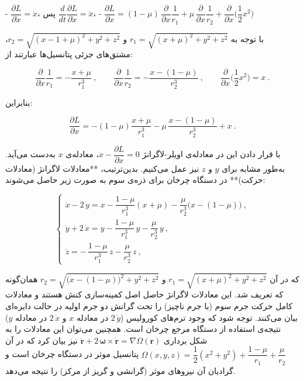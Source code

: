 - $\displaystyle \dfrac{\partial L}{\partial \dot{x}} = \dot{x}$، پس $\dfrac{d}{dt}\dfrac{\partial L}{\partial \dot{x}} = \ddot{x}$،  
- $\displaystyle \dfrac{\partial L}{\partial x} = (1-\mu)\,\dfrac{\partial}{\partial x}\dfrac{1}{r_1} + \mu\,\dfrac{\partial}{\partial x}\dfrac{1}{r_2} + \dfrac{\partial}{\partial x}\Big(\dfrac{1}{2}x^2\Big)$ 

با توجه به $r_1=\sqrt{(x+\mu)^2+y^2+z^2}$ و $r_2=\sqrt{(x-1+\mu)^2+y^2+z^2}$، مشتق‌های جزئی پتانسیل‌ها عبارتند از:

$$ 
\dfrac{\partial}{\partial x}\dfrac{1}{r_1} = -\dfrac{x+\mu}{r_1^3}~, \qquad 
\dfrac{\partial}{\partial x}\dfrac{1}{r_2} = -\dfrac{x-(1-\mu)}{r_2^3}~, \qquad 
\dfrac{\partial}{\partial x}\Big(\dfrac{1}{2}x^2\Big) = x~. 
$$

بنابراین:

$$ 
\dfrac{\partial L}{\partial x} = -(1-\mu)\dfrac{x+\mu}{r_1^3} - \mu\,\dfrac{x-(1-\mu)}{r_2^3} + x~. 
$$

با قرار دادن این در معادله‌ی اویلر-لاگرانژ $\ddot{x} - \dfrac{\partial L}{\partial x}=0$، معادله‌ی $x$ به‌دست می‌آید. به‌طور مشابه برای $y$ و $z$ نیز عمل می‌کنیم. بدین‌ترتیب، **معادلات لاگرانژ (معادلات حرکت)** در دستگاه چرخان برای ذره‌ی سوم به صورت زیر حاصل می‌شوند:

$$ 
\begin{cases}
	\displaystyle \ddot{x} - 2\,\dot{y} = x - \dfrac{1-\mu}{r_1^3}(x+\mu) - \dfrac{\mu}{r_2^3}\Big(x-(1-\mu)\Big)~,  \\[2ex]
	\displaystyle \ddot{y} + 2\,\dot{x} = y - \dfrac{1-\mu}{r_1^3}\,y - \dfrac{\mu}{r_2^3}\,y~,  \\[2ex]
	\displaystyle \ddot{z} = -\,\dfrac{1-\mu}{r_1^3}\,z - \dfrac{\mu}{r_2^3}\,z~, 
\end{cases}
$$

که در آن $r_1=\sqrt{(x+\mu)^2+y^2+z^2}$ و $r_2=\sqrt{\big(x-(1-\mu)\big)^2+y^2+z^2}$ همان‌گونه که تعریف شد. این معادلات لاگرانژ حاصل اصل کمینه‌سازی کنش هستند و معادلات کامل حرکت جرم سوم (با جرم ناچیز) را تحت گرانش دو جرم اولیه در حالت دایره‌ای بیان می‌کنند. توجه شود که وجود ترم‌های کورولیس ($2\,\dot{y}$ در معادله $x$ و $2\,\dot{x}$ در معادله $y$) نتیجه‌ی استفاده از دستگاه مرجع چرخان است. همچنین می‌توان این معادلات را به شکل برداری $ \ddot{\mathbf{r}} + 2\,\mathbf{\omega}\times \dot{\mathbf{r}} = \nabla \Omega(\mathbf{r})$ نیز بیان کرد که در آن $\Omega(x,y,z) = \dfrac{1}{2}(x^2+y^2) + \dfrac{1-\mu}{r_1} + \dfrac{\mu}{r_2}$ پتانسیل موثر در دستگاه چرخان است و گرادیان آن نیروهای موثر (گرانشی و گریز از مرکز) را نتیجه می‌دهد.










